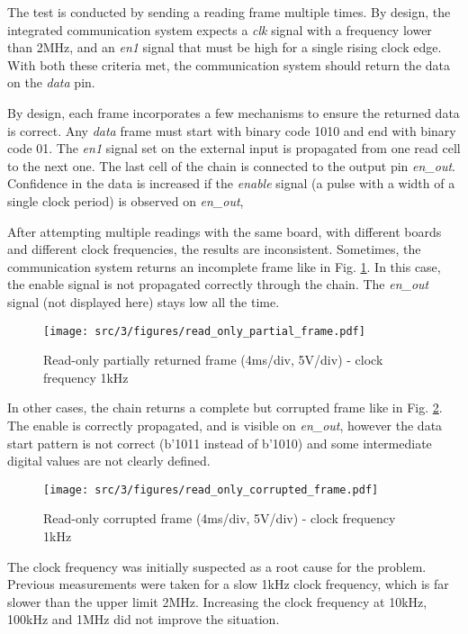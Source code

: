 The test is conducted by sending a reading frame multiple times.
By design, the integrated communication system expects a \textit{clk} signal with a frequency lower than 2MHz, and an \textit{en1} signal that must be high for a single rising clock edge.
With both these criteria met, the communication system should return the data on the \textit{data} pin.

By design, each frame incorporates a few mechanisms to ensure the returned data is correct.
Any \textit{data} frame must start with binary code 1010 and end with binary code 01.
The \textit{en1} signal set on the external input is propagated from one read cell to the next one.
The last cell of the chain is connected to the output pin \textit{en\_out}.
Confidence in the data is increased if the \textit{enable} signal (a pulse with a width of a single clock period) is observed on \textit{en\_out},

After attempting multiple readings with the same board, with different boards and different clock frequencies, the results are inconsistent.
Sometimes, the communication system returns an incomplete frame like in Fig. \ref{fig:read-only-partial-frame}.
In this case, the enable signal is not propagated correctly through the chain.
The \textit{en\_out} signal (not displayed here) stays low all the time.

\begin{figure}[!h]
  \centering
  \texttt{[image: src/3/figures/read\_only\_partial\_frame.pdf]}
  \caption{Read-only partially returned frame (4ms/div, 5V/div) - clock frequency 1kHz}
  \label{fig:read-only-partial-frame}
\end{figure}

In other cases, the chain returns a complete but corrupted frame like in Fig. \ref{fig:read-only-full-frame}.
The enable is correctly propagated, and is visible on \textit{en\_out}, however the data start pattern is not correct (b'1011 instead of b'1010) and some intermediate digital values are not clearly defined.

\begin{figure}[!h]
  \centering
  \texttt{[image: src/3/figures/read\_only\_corrupted\_frame.pdf]}
  \caption{Read-only corrupted frame (4ms/div, 5V/div) - clock frequency 1kHz}
  \label{fig:read-only-full-frame}
\end{figure}

The clock frequency was initially suspected as a root cause for the problem.
Previous measurements were taken for a slow 1kHz clock frequency, which is far slower than the upper limit 2MHz.
Increasing the clock frequency at 10kHz, 100kHz and 1MHz did not improve the situation.

